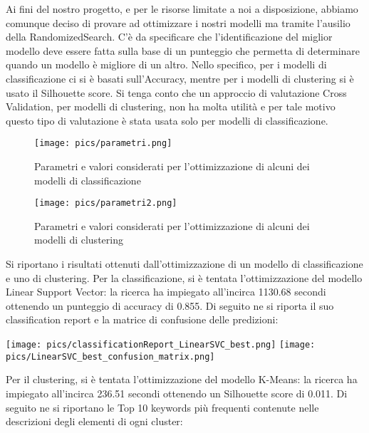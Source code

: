\documentclass[12pt,oneside]{article}
\begin{document}
\begin{justify}
        Ai fini del nostro progetto, e per le risorse limitate a noi a disposizione, abbiamo comunque deciso di provare ad ottimizzare i nostri modelli ma tramite l’ausilio della RandomizedSearch. C’è da specificare che l’identificazione del miglior modello deve essere fatta sulla base di un punteggio che permetta di determinare quando un modello è migliore di un altro. Nello specifico, per i modelli di classificazione ci si è basati sull’Accuracy, mentre per i modelli di clustering si è usato il Silhouette score. Si tenga conto che un approccio di valutazione Cross Validation, per modelli di clustering, non ha molta utilità e per tale motivo questo tipo di valutazione è stata usata solo per modelli di classificazione.
        \end{justify}

        \begin{figure}[H]
        \texttt{[image: pics/parametri.png]}
        \caption{Parametri e valori considerati per l’ottimizzazione di alcuni dei modelli di classificazione}
        \end{figure}

        \begin{figure}[H]
        \texttt{[image: pics/parametri2.png]}
        \caption{Parametri e valori considerati per l’ottimizzazione di alcuni dei modelli di clustering}
        \end{figure}
        
        \begin{justify}
        Si riportano i risultati ottenuti dall’ottimizzazione di un modello di classificazione e uno di clustering.
        Per la classificazione, si è tentata l’ottimizzazione del modello Linear Support Vector: la ricerca ha impiegato all’incirca 1130.68 secondi ottenendo un punteggio di accuracy di 0.855. Di seguito ne si riporta il suo classification report e la matrice di confusione delle predizioni:
        \end{justify}

        \texttt{[image: pics/classificationReport\_LinearSVC\_best.png]}
        \texttt{[image: pics/LinearSVC\_best\_confusion\_matrix.png]}
        
        \begin{justify}
        Per il clustering, si è tentata l’ottimizzazione del modello K-Means: la ricerca ha impiegato all’incirca 236.51 secondi ottenendo un Silhouette score di 0.011. 
        Di seguito ne si riportano le Top 10 keywords più frequenti contenute nelle descrizioni degli elementi di ogni cluster:
        \end{justify}
\end{document}
